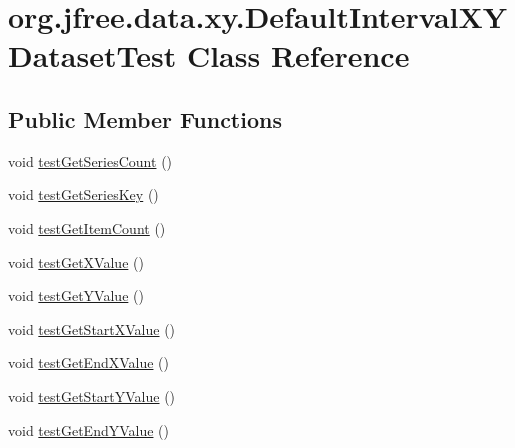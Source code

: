 \hypertarget{classorg_1_1jfree_1_1data_1_1xy_1_1_default_interval_x_y_dataset_test}{}\section{org.\+jfree.\+data.\+xy.\+Default\+Interval\+X\+Y\+Dataset\+Test Class Reference}
\label{classorg_1_1jfree_1_1data_1_1xy_1_1_default_interval_x_y_dataset_test}
\subsection*{Public Member Functions}
\begin{DoxyCompactItemize}
\item 
void \mbox{\hyperlink{classorg_1_1jfree_1_1data_1_1xy_1_1_default_interval_x_y_dataset_test_ab27e177e390a006cb81079c1d1f37890}{test\+Get\+Series\+Count}} ()
\item 
void \mbox{\hyperlink{classorg_1_1jfree_1_1data_1_1xy_1_1_default_interval_x_y_dataset_test_a8f85962d4eb2213135530785950d30f8}{test\+Get\+Series\+Key}} ()
\item 
void \mbox{\hyperlink{classorg_1_1jfree_1_1data_1_1xy_1_1_default_interval_x_y_dataset_test_aee33b58e16f31fbc28bb2e71f38d7db1}{test\+Get\+Item\+Count}} ()
\item 
void \mbox{\hyperlink{classorg_1_1jfree_1_1data_1_1xy_1_1_default_interval_x_y_dataset_test_a6dcb7140298752c47b3f94d17712693d}{test\+Get\+X\+Value}} ()
\item 
void \mbox{\hyperlink{classorg_1_1jfree_1_1data_1_1xy_1_1_default_interval_x_y_dataset_test_a3450dfc0c48e23e5e08f2ebbd27d1747}{test\+Get\+Y\+Value}} ()
\item 
void \mbox{\hyperlink{classorg_1_1jfree_1_1data_1_1xy_1_1_default_interval_x_y_dataset_test_ac270b316ef950794e2734f107ef1fcc3}{test\+Get\+Start\+X\+Value}} ()
\item 
void \mbox{\hyperlink{classorg_1_1jfree_1_1data_1_1xy_1_1_default_interval_x_y_dataset_test_a819f022235d4f9cb77ccb43aa0bc7ee6}{test\+Get\+End\+X\+Value}} ()
\item 
void \mbox{\hyperlink{classorg_1_1jfree_1_1data_1_1xy_1_1_default_interval_x_y_dataset_test_ab646c91d4b140c51c72c1170dec14048}{test\+Get\+Start\+Y\+Value}} ()
\item 
void \mbox{\hyperlink{classorg_1_1jfree_1_1data_1_1xy_1_1_default_interval_x_y_dataset_test_a4946db023ffa0bed2bda72ec0f5fcd0c}{test\+Get\+End\+Y\+Value}} ()

\end{DoxyCompactItemize}
